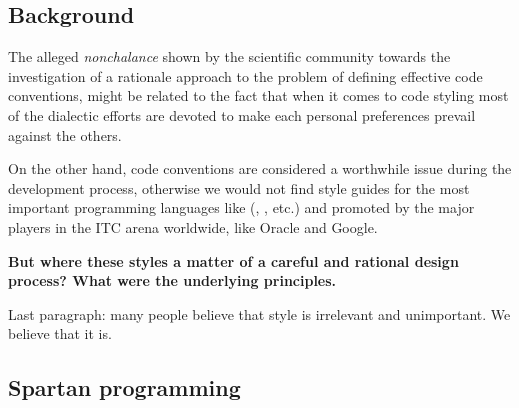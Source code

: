 \subsection{Background}

% 

The alleged \emph{nonchalance} shown by the scientific community towards the
investigation of a rationale approach to the problem of defining effective code
conventions, might be related to the fact that when it comes to code styling
most of the dialectic efforts are devoted to make each personal preferences 
prevail against the others.



On the other hand, code conventions are considered a worthwhile issue during
the development process, otherwise we would not find style guides for the most important
programming languages like (\Java, \CC, etc.) and promoted by the major players in
the ITC arena worldwide, like Oracle 
and Google.

\textbf{But where these styles a matter of a careful and rational design process?
What were the underlying principles.}

Last paragraph: many people believe that style is irrelevant and unimportant.
We believe that it is.

\subsection{Spartan programming}

